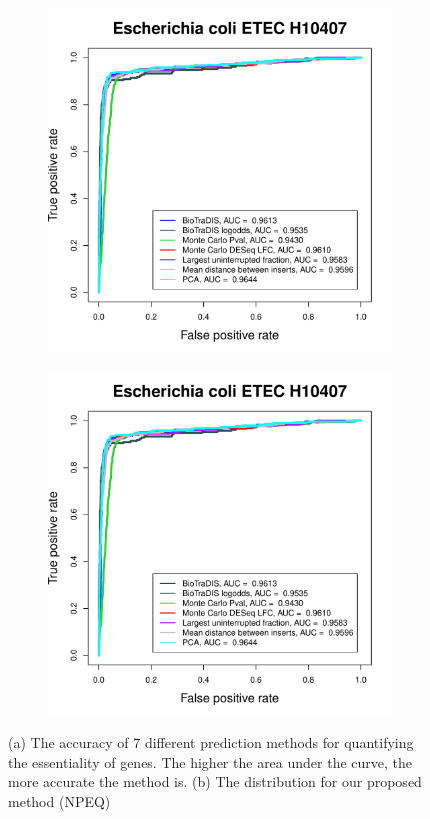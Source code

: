 \documentclass[12pt,letterpaper]{article}
\begin{document}
\begin{figure}
\captionsetup[subfigure]{justification=centering}
\begin{subfigure}{.5\textwidth}
  \centering
  \includegraphics[page=1, scale=0.4]{essential-call-comparison-ETEC.pdf}
  \caption{}
  \label{fig:benchmark}
\end{subfigure}%
\begin{subfigure}{.5\textwidth}
  \centering
  \includegraphics[page=10, scale=0.4]{essential-call-comparison-ETEC.pdf}
  \caption{}
  \label{fig:pca}
\end{subfigure}
\caption{(a) The accuracy of 7 different prediction methods for quantifying the essentiality of genes. The higher the area under the curve, the more accurate the method is. (b) The distribution for our proposed method (NPEQ)}
\label{fig:essentiality-call}
\end{figure}
\end{document}
